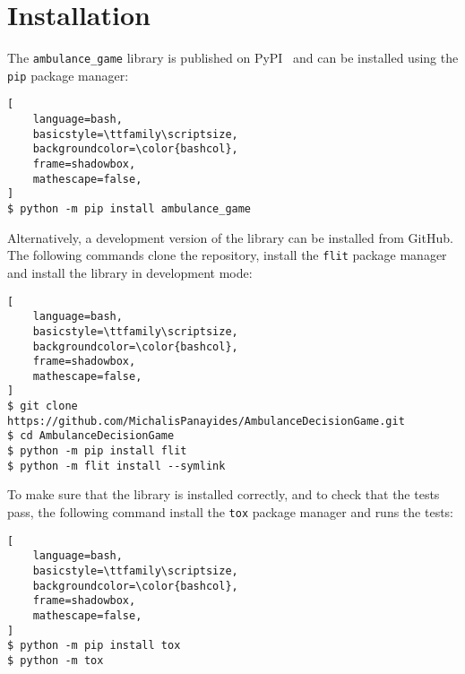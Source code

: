 \section{Installation}\label{sec:ambulance_game_installation}

The \texttt{ambulance\_game} library is published on PyPI~\cite{pypi}
and can be installed using the \texttt{pip} package manager:

\begin{lstlisting}[
    language=bash,
    basicstyle=\ttfamily\scriptsize,
    backgroundcolor=\color{bashcol},
    frame=shadowbox,
    mathescape=false,
]
$ python -m pip install ambulance_game
\end{lstlisting}

Alternatively, a development version of the library can be installed from
GitHub.
The following commands clone the repository, install the \texttt{flit}
package manager and install the library in development mode: 

\begin{lstlisting}[
    language=bash,
    basicstyle=\ttfamily\scriptsize,
    backgroundcolor=\color{bashcol},
    frame=shadowbox,
    mathescape=false,
]
$ git clone https://github.com/MichalisPanayides/AmbulanceDecisionGame.git
$ cd AmbulanceDecisionGame
$ python -m pip install flit
$ python -m flit install --symlink
\end{lstlisting}

To make sure that the library is installed correctly, and to check that the
tests pass, the following command install the \texttt{tox} package manager
and runs the tests:

\begin{lstlisting}[
    language=bash,
    basicstyle=\ttfamily\scriptsize,
    backgroundcolor=\color{bashcol},
    frame=shadowbox,
    mathescape=false,
]
$ python -m pip install tox
$ python -m tox
\end{lstlisting}
